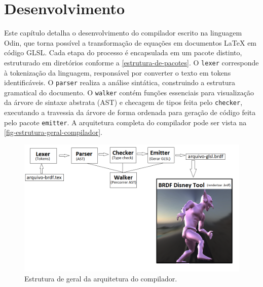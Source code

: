 
\chapter{Desenvolvimento}

Este capítulo detalha o desenvolvimento do compilador escrito na linguagem Odin, que torna possível a transformação de equações em documentos \LaTeX{} em código GLSL. Cada etapa do processo é encapsulada em um pacote distinto, estruturado em diretórios conforme a \autoref{estrutura-de-pacotes}. O \texttt{lexer} corresponde à tokenização da linguagem, responsável por converter o texto em tokens identificáveis. O \texttt{parser} realiza a análise sintática, construindo a estrutura gramatical do documento. O \texttt{walker} contém funções essenciais para visualização da árvore de sintaxe abstrata (AST) e checagem de tipos feita pelo \texttt{checker}, executando a travessia da árvore de forma ordenada para geração de código feita pelo pacote \texttt{emitter}. A arquitetura completa do compilador pode ser vista na \autoref{fig-estrutura-geral-compilador}.

\begin{figure}[!ht]
  \caption{\label{fig-estrutura-geral-compilador} \small Estrutura de geral da arquitetura do compilador.}
  \begin{center}
    \includegraphics[scale=0.62]{./Imagens/estutura-geral-do-projeto.png}
  \end{center}
\end{figure}


